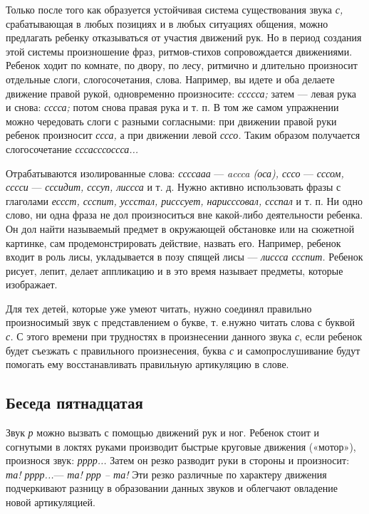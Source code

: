 \documentclass[a5paper]{book}
\renewcommand{\emph}[1]{\textit{#1}}
\begin{document}
Только после того как образуется устойчивая система существования звука
\emph{с,} срабатывающая в любых позициях и в любых ситуациях общения,
можно предлагать ребенку отказываться от участия движений рук. Но в
период создания этой системы произношение фраз, ритмов-стихов
сопровождается движениями. Ребенок ходит по комнате, по двору, по лесу,
ритмично и длительно произносит отдельные слоги, слогосочетания, слова.
Например, вы идете и оба делаете движение правой рукой, одновременно
произносите: \emph{ссссса;} затем --- левая рука и снова: \emph{сссса;}
потом снова правая рука и т. п. В том же самом упражнении можно
чередовать слоги с разными согласными: при движении правой руки ребенок
произносит \emph{ссса,} а при движении левой \emph{сссо.} Таким образом
получается слогосочетание \emph{сссасссоссса...}

Отрабатываются изолированные слова: \emph{ссссааа} --- \emph{accca
(оса), сссо} --- \emph{сссом, сссси} --- \emph{сссидит, сссуп, лиссса} и
т. д. Нужно активно использовать фразы с глаголами \emph{ессст, ссспит,
уссстал, рисссует, нарисссовал, ссспал} и т. п. Ни одно слово, ни одна
фраза не дол произноситься вне какой-либо деятельности ребенка. Он дол
найти называемый предмет в окружающей обстановке или на сюжетной
картинке, сам продемонстрировать действие, назвать его. Например,
ребенок входит в роль лисы, укладывается в позу спящей лисы ---
\emph{лиссса ссспит.} Ребенок рисует, лепит, делает аппликацию и в это
время называет предметы, которые изображает.

Для тех детей, которые уже умеют читать, нужно соединял правильно
произносимый звук с представлением о букве, т. е.нужно читать слова с
буквой \emph{с.} С этого времени при трудностях в произнесении данного
звука \emph{с}, если ребенок будет съезжать с правильного произнесения,
буква \emph{с} и самопрослушивание будут помогать ему восстанавливать
правильную артикуляцию в слове.

\subsection*{Беседа пятнадцатая}

Звук \emph{р} можно вызвать с помощью движений рук и ног. Ребенок стоит
и согнутыми в локтях руками производит быстрые круговые движения
(«мотор»), произнося звук: \emph{рррр...} Затем он резко разводит руки в
стороны и произносит: \emph{та! рррр...}--- \emph{та! ррр -- та!} Эти
резко различные по характеру движения подчеркивают разницу в образовании
данных звуков и облегчают овладение новой артикуляцией.
\end{document}
